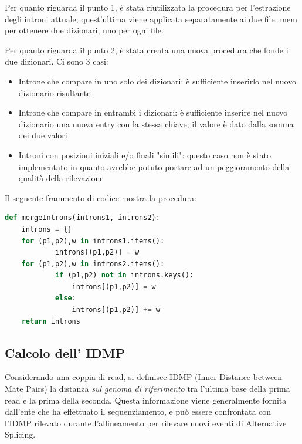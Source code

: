Per quanto riguarda il punto 1, è stata riutilizzata la procedura per l'estrazione degli introni attuale; quest'ultima viene applicata separatamente ai due file .mem per ottenere due dizionari, uno per ogni file.

Per quanto riguarda il punto 2, è stata creata una nuova procedura che fonde i due dizionari. Ci sono 3 casi:

\newpage
\begin{itemize}
	\item Introne che compare in uno solo dei dizionari: è sufficiente inserirlo nel nuovo dizionario risultante
	\item Introne che compare in entrambi i dizionari: è sufficiente inserire nel nuovo dizionario una nuova entry con la stessa chiave; il valore è dato dalla somma dei due valori
	\item Introni con posizioni iniziali e/o finali "simili": questo caso non è stato implementato in quanto avrebbe potuto portare ad un peggioramento della qualità della rilevazione
\end{itemize}


Il seguente frammento di codice mostra la procedura:

\begin{lstlisting}[language=Python]
def mergeIntrons(introns1, introns2):
    introns = {}
    for (p1,p2),w in introns1.items():
            introns[(p1,p2)] = w
    for (p1,p2),w in introns2.items():
            if (p1,p2) not in introns.keys():
                introns[(p1,p2)] = w
            else:
                introns[(p1,p2)] += w
    return introns
\end{lstlisting}



\subsection{Calcolo dell' IDMP}
Considerando una coppia di read, si definisce IDMP (Inner Distance between Mate Pairs) la distanza \textit{sul genoma di riferimento} tra l'ultima base della prima read e la prima della seconda. Questa informazione viene generalmente fornita dall'ente che ha effettuato il sequenziamento, e può essere confrontata con l'IDMP rilevato durante l'allineamento per rilevare nuovi eventi di Alternative Splicing.

